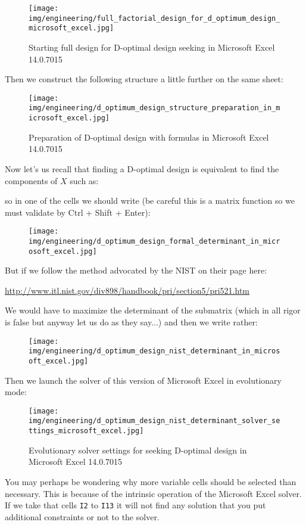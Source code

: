 	\begin{figure}[H]
		\centering
		\texttt{[image: img/engineering/full\_factorial\_design\_for\_d\_optimum\_design\_microsoft\_excel.jpg]}
		\caption[]{Starting full design for D-optimal design seeking in Microsoft Excel 14.0.7015}	
	\end{figure}
	Then we construct the following structure a little further on the same sheet:
	\begin{figure}[H]
		\centering
		\texttt{[image: img/engineering/d\_optimum\_design\_structure\_preparation\_in\_microsoft\_excel.jpg]}
		\caption[]{Preparation of D-optimal design with formulas in Microsoft Excel 14.0.7015}	
	\end{figure}
	Now let's us recall that finding a D-optimal design is equivalent to find the components of $X$ such as:
	
	so in one of the cells we should write (be careful this is a matrix function so we must validate by Ctrl + Shift + Enter):
	\begin{figure}[H]
		\centering
		\texttt{[image: img/engineering/d\_optimum\_design\_formal\_determinant\_in\_microsoft\_excel.jpg]}
	\end{figure}
	But if we follow the method advocated by the NIST on their page here:
	\begin{center}
	\url{http://www.itl.nist.gov/div898/handbook/pri/section5/pri521.htm}
	\end{center}
	We would have to maximize the determinant of the submatrix (which in all rigor is false but anyway let us do as they say...) and then we write rather:
	\begin{figure}[H]
		\centering
		\texttt{[image: img/engineering/d\_optimum\_design\_nist\_determinant\_in\_microsoft\_excel.jpg]}
	\end{figure}
	Then we launch the solver of this version of Microsoft Excel in evolutionary mode:
	\begin{figure}[H]
		\centering
		\texttt{[image: img/engineering/d\_optimum\_design\_nist\_determinant\_solver\_settings\_microsoft\_excel.jpg]}
		\caption{Evolutionary solver settings for seeking D-optimal design in Microsoft Excel 14.0.7015}
	\end{figure}
	You may perhaps be wondering why more variable cells should be selected than necessary. This is because of the intrinsic operation of the Microsoft Excel solver. If we take that cells \texttt{I2} to \texttt{I13} it will not find any solution that you put additional constraints or not to the solver.

